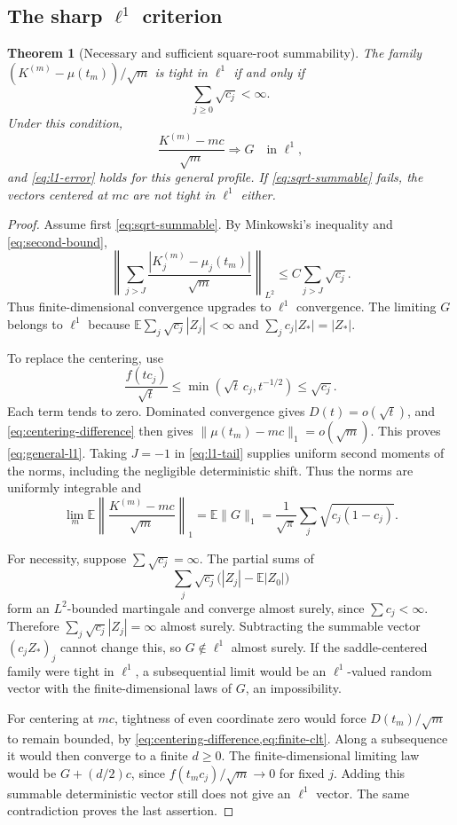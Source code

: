 \documentclass[11pt,a4paper]{article}
\numberwithin{equation}{section}
\newtheorem{theorem}{Theorem}[section]
\theoremstyle{definition}
\theoremstyle{remark}
\newcommand{\E}{\mathbb E}
\begin{document}
\subsection{The sharp \texorpdfstring{$\ell^1$}{l1} criterion}
\begin{theorem}[Necessary and sufficient square-root summability]
\label{thm:l1-criterion}
The family $(K^{(m)}-\mu(t_m))/\sqrt m$ is tight in $\ell^1$ if and
only if
\begin{equation}
\sum_{j\ge0}\sqrt{c_j}<\infty.
\label{eq:sqrt-summable}
\end{equation}
Under this condition,
\begin{equation}
\frac{K^{(m)}-mc}{\sqrt m}\Rightarrow G
\quad\text{in }\ell^1,
\label{eq:general-l1}
\end{equation}
and \cref{eq:l1-error} holds for this general profile. If
\cref{eq:sqrt-summable} fails, the vectors centered at $mc$ are not
tight in $\ell^1$ either.
\end{theorem}
\begin{proof}
Assume first \cref{eq:sqrt-summable}. By Minkowski's inequality and
\cref{eq:second-bound},
\begin{equation}
\left\|\sum_{j>J}\frac{|K_j^{(m)}-\mu_j(t_m)|}{\sqrt m}\right\|_{L^2}
\le C\sum_{j>J}\sqrt{c_j}.
\label{eq:l1-tail}
\end{equation}
Thus finite-dimensional convergence upgrades to $\ell^1$ convergence.
The limiting $G$ belongs to $\ell^1$ because
$\E\sum_j\sqrt{c_j}|Z_j|<\infty$ and $\sum_jc_j|Z_*|=|Z_*|$.

To replace the centering, use
\[
\frac{f(tc_j)}{\sqrt t}
\le\min(\sqrt t\,c_j,t^{-1/2})\le\sqrt{c_j}.
\]
Each term tends to zero. Dominated convergence gives
$D(t)=o(\sqrt t)$, and \cref{eq:centering-difference} then gives
$\|\mu(t_m)-mc\|_1=o(\sqrt m)$. This proves
\cref{eq:general-l1}. Taking $J=-1$ in \cref{eq:l1-tail} supplies
uniform second moments of the norms, including the negligible deterministic
shift. Thus the norms are uniformly integrable and
\[
\lim_m\E\left\|\frac{K^{(m)}-mc}{\sqrt m}\right\|_1
=\E\|G\|_1
=\frac1{\sqrt\pi}\sum_j\sqrt{c_j(1-c_j)}.
\]

For necessity, suppose $\sum\sqrt{c_j}=\infty$.
The partial sums of
\[
\sum_j\sqrt{c_j}\bigl(|Z_j|-\E|Z_0|\bigr)
\]
form an $L^2$-bounded martingale and converge almost surely, since
$\sum c_j<\infty$. Therefore $\sum_j\sqrt{c_j}|Z_j|=\infty$
almost surely. Subtracting the summable vector $(c_jZ_*)_j$ cannot change
this, so $G\notin\ell^1$ almost surely. If the saddle-centered family
were tight in $\ell^1$, a subsequential limit would be an $\ell^1$-valued
random vector with the finite-dimensional laws of $G$, an impossibility.

For centering at $mc$, tightness of even coordinate zero would force
$D(t_m)/\sqrt m$ to remain bounded, by
\cref{eq:centering-difference,eq:finite-clt}. Along a subsequence it
would then converge to a finite $d\ge0$. The finite-dimensional limiting
law would be $G+(d/2)c$, since $f(t_mc_j)/\sqrt m\to0$ for fixed $j$.
Adding this summable deterministic vector still does not give an
$\ell^1$ vector. The same contradiction proves the last assertion.
\end{proof}
\end{document}

